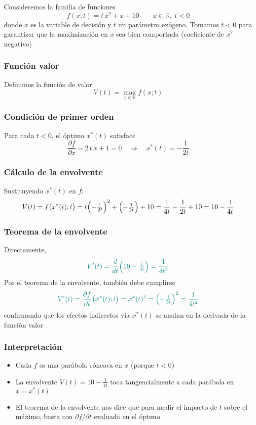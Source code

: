 \documentclass{article}
\newcommand{\R}{\ensuremath{\mathbb{R}}}
\begin{document}
Consideremos la familia de funciones
\[
f(x; t)=t\,x^2 + x + 10
\qquad x\in\R,\;t<0
\]
donde \(x\) es la variable de decisión y \(t\) un parámetro exógeno. Tomamos \(t<0\) para garantizar que la maximización en \(x\) sea bien comportada (coeficiente de \(x^2\) negativo)

\subsubsection*{Función valor}

Definimos la función de valor
\[
V(t)=\max_{x\in\R}f(x;t)
\]

\subsubsection*{Condición de primer orden}

Para cada \(t<0\), el óptimo \(x^*(t)\) satisface
\[
\frac{\partial f}{\partial x}
=2\,t\,x + 1=0
\quad\Longrightarrow\quad
x^*(t)=-\frac{1}{2t}
\]

\subsubsection*{Cálculo de la envolvente}

Sustituyendo \(x^*(t)\) en \(f\):
\[
V(t)
= f\bigl(x^*(t);t\bigr)
= t\Bigl(-\tfrac{1}{2t}\Bigr)^2
+ \Bigl(-\tfrac{1}{2t}\Bigr)
+ 10
= \frac{1}{4t} - \frac{1}{2t} + 10
= 10 - \frac{1}{4t}
\]

\subsubsection*{Teorema de la envolvente}

Directamente,
\[
\color{teal}
V'(t)
= \frac{d}{dt}\Bigl(10 - \tfrac{1}{4t}\Bigr)
= \frac{1}{4t^2}
\]
Por el teorema de la envolvente, también debe cumplirse
\[
\color{teal}
V'(t)
=\frac{\partial f}{\partial t}\bigl(x^*(t);t\bigr)
= x^*(t)^2
= \Bigl(-\tfrac{1}{2t}\Bigr)^2
= \frac{1}{4t^2}
\]
confirmando que los efectos indirectos vía \(x^*(t)\) se anulan en la derivada de la función valor

\subsubsection*{Interpretación}

\begin{itemize}
  \item Cada \(f\) es una parábola cóncava en \(x\) (porque \(t<0\))  
  \item La envolvente \(V(t)=10-\tfrac{1}{4t}\) toca tangencialmente a cada parábola en \(x=x^*(t)\)  
  \item El teorema de la envolvente nos dice que para medir el impacto de \(t\) sobre el máximo, basta con \(\partial f/\partial t\) evaluada en el óptimo
\end{itemize}
\end{document}
